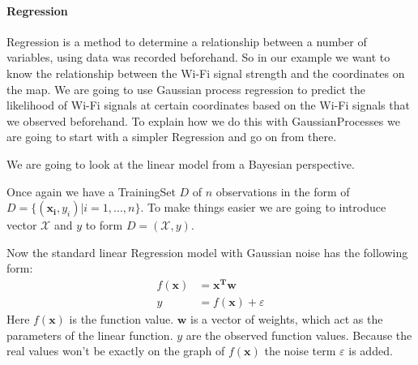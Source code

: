 \paragraph{Regression}
\Gls{Regression} is a method to determine a relationship between a number of variables, using data was recorded beforehand. So in our example we want to know the relationship between the Wi-Fi signal strength and the coordinates on the map. 
We are going to use Gaussian process regression to predict the likelihood of Wi-Fi signals at certain coordinates based on the Wi-Fi signals that we observed beforehand. To explain how we do this with \Gls{GaussianProcess}es we are going to start with a simpler \gls{Regression} and go on from there. 

We are going to look at the linear model from a Bayesian perspective. 

Once again we have a \gls{TrainingSet} $D$ of $n$ observations in the form of $D = \{(\mathbf{x_i},y_i)|i=1,...,n\}$. To make things easier we are going to introduce vector $\mathcal{X}$ and $y$ to form $D = (\mathcal{X},y)$.

Now the standard linear \gls{Regression} model with Gaussian noise has the following form:
\begin{equation}\label{linearmodel}
\begin{aligned}
f(\mathbf{x}) &= \mathbf{x^T}\mathbf{w}\\
y &= f(\mathbf{x}) + \varepsilon
\end{aligned}
\end{equation}
Here $f(\mathbf{x})$ is the function value. $\mathbf{w}$ is a vector of weights, which act as the parameters of the linear function. $y$ are the observed function values. Because the real values won't be exactly on the graph of $f(\mathbf{x})$ the noise term $\varepsilon$ is added\citep[p. 8]{Rasmussen:2005:GPM:1162254}. 

